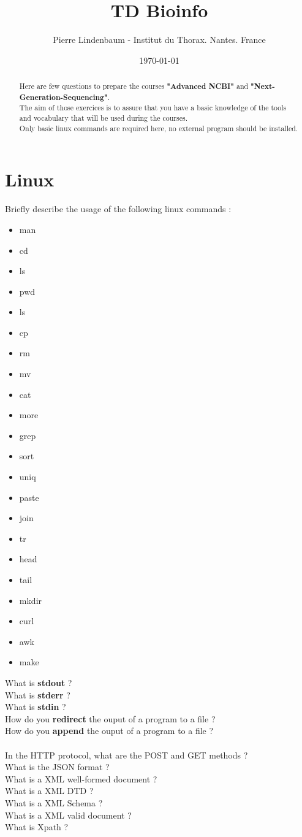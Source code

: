 \documentclass{article}
\title{TD Bioinfo}
\author{Pierre Lindenbaum - Institut du Thorax. Nantes. France}
\date{\today}
\begin{document}
\maketitle
\begin{abstract}
Here are few questions to prepare the courses \textbf{"Advanced NCBI"} and \textbf{"Next-Generation-Sequencing"}.\\
The aim of those exercices is to assure that you have a basic knowledge of the tools and vocabulary that will be used during the courses.\\
Only basic linux commands are required here, no external program should be installed.
\end{abstract}

\section{Linux}
Briefly describe the usage of the following linux commands :
\begin{itemize}
\item man
\item cd
\item ls
\item pwd
\item ls
\item cp
\item rm
\item mv
\item cat
\item more
\item grep
\item sort
\item uniq
\item paste
\item join
\item tr
\item head
\item tail
\item mkdir
\item curl
\item awk
\item make
\end{itemize}
\noindent
What is 	\textbf{stdout} ? \\
What is 	\textbf{stderr} ?\\
What is 	\textbf{stdin} ?\\
How do you 	\textbf{redirect} the ouput of a program to a file ?\\
How do you 	\textbf{append} the ouput of a program to a file ?\\
\\
In the HTTP protocol, what are the POST and GET methods ?\\
What is the JSON format ?\\
What is a XML well-formed document ?\\
What is a XML DTD ?\\
What is a XML Schema ?\\
What is a XML valid document ?\\
What is Xpath ?\\
\end{document}
